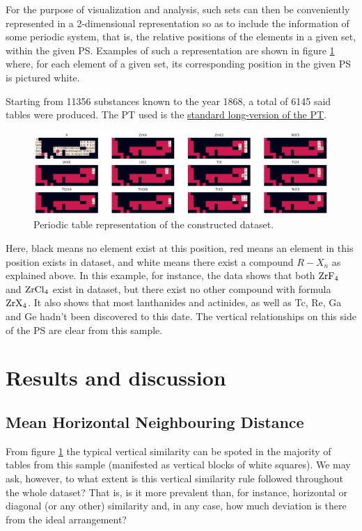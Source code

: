 \documentclass[]{article}
\begin{document}
For the purpose of visualization and analysis, such sets can then be conveniently represented in a 2-dimensional representation so as to include the information of some periodic system, that is, the relative positions of the elements in a given set, within the given PS. Examples of such a representation are shown in figure \ref{fig:fig1} where, for each element of a given set, its corresponding position in the given PS is pictured white. 

Starting from 11356 substances known to the year 1868, a total of 6145 said tables were produced. The PT used is the \href{https://www.chemicool.com/longperiodictable.html}{standard long-version of the PT}.

\begin{figure}[h!]
  \centering
	\includegraphics[width=18.0cm]{tables.png}
	\caption{Periodic table representation of the constructed dataset.}
	\label{fig:fig1}
\end{figure}

Here, black means no element exist at this position, red means an element in this position exists in dataset, and white means there exist a compound $R-X_n$ as explained above. In this example, for instance, the data shows that both $\ce{ZrF4}$ and $\ce{ZrCl4}$ exist in dataset, but there exist no other compound with formula $\ce{ZrX4}$. It also shows that most lanthanides and actinides, as well as Tc, Re, Ga and Ge hadn't been discovered to this date. The vertical relationships on this side of the PS are clear from this sample.

\section{Results and discussion}

\subsection{Mean Horizontal Neighbouring Distance}
From figure \ref{fig:fig1} the typical vertical similarity can be spoted in the majority of tables from this sample (manifested as vertical blocks of white squares). We may ask, however, to what extent is this vertical similarity rule followed throughout the whole dataset? That is, is it more prevalent than, for instance, horizontal or diagonal (or any other) similarity and, in any case, how much deviation is there from the ideal arrangement?
\end{document}
